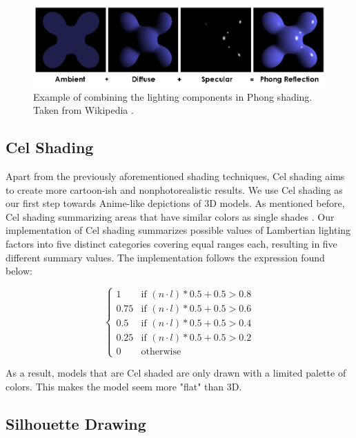 \documentclass[10pt,twocolumn,letterpaper]{article}
\begin{document}
\begin{figure}[t]
  \centering
  \includegraphics[width=1\linewidth]{Phong_components_version_4.png}

   \caption{Example of combining the lighting components in Phong shading. Taken from Wikipedia \cite{wiki:Phong_shading}.}
   \label{fig:phong-lighting}
\end{figure}

\subsection{Cel Shading}

Apart from the previously aforementioned shading techniques, Cel shading aims to create more cartoon-ish and nonphotorealistic results. We use Cel shading as our first step towards Anime-like depictions of 3D models. As mentioned before, Cel shading summarizing areas that have similar colors as single shades \cite{wiki:Cel_shading}. Our implementation of Cel shading summarizes possible values of Lambertian lighting factors into five distinct categories covering equal ranges each, resulting in five different summary values. The implementation follows the expression found below:

\begin{equation}
    \begin{cases}
         1 &\text{if } (n \cdot l) * 0.5 + 0.5 > 0.8\\
         0.75 &\text{if } (n \cdot l) * 0.5 + 0.5 > 0.6\\
         0.5 &\text{if } (n \cdot l) * 0.5 + 0.5 > 0.4\\
         0.25 &\text{if } (n \cdot l) * 0.5 + 0.5 > 0.2\\
         0 &\text{otherwise}
    \end{cases}
    \label{eq:cel}
\end{equation}

As a result, models that are Cel shaded are only drawn with a limited palette of colors. This makes the model seem more "flat" than 3D. 

\subsection{Silhouette Drawing}
\end{document}
